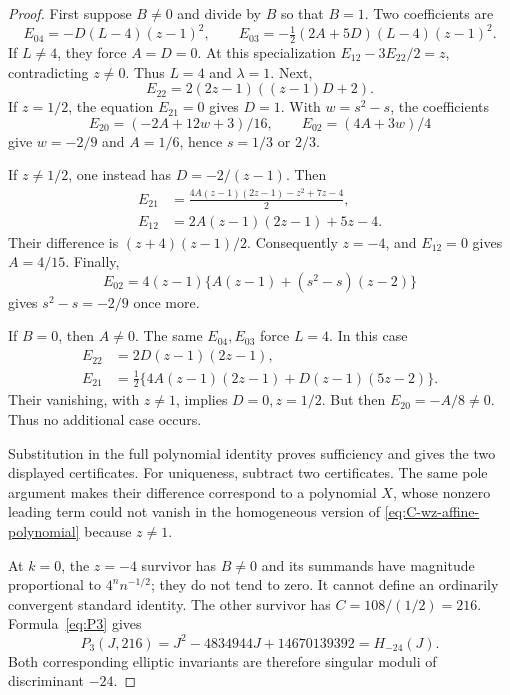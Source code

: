 \begin{proof}
First suppose $B\ne0$ and divide by $B$ so that $B=1$.  Two
coefficients are
\[
 E_{04}=-D(L-4)(z-1)^2,\qquad
 E_{03}=-\tfrac12(2A+5D)(L-4)(z-1)^2.
\]
If $L\ne4$, they force $A=D=0$.  At this specialization
$E_{12}-3E_{22}/2=z$, contradicting $z\ne0$.  Thus $L=4$ and
$\lambda=1$.  Next,
\[
 E_{22}=2(2z-1)((z-1)D+2).
\]
If $z=1/2$, the equation $E_{21}=0$ gives $D=1$.  With
$w=s^2-s$, the coefficients
\[
 E_{20}=(-2A+12w+3)/16,\qquad E_{02}=(4A+3w)/4
\]
give $w=-2/9$ and $A=1/6$, hence $s=1/3$ or $2/3$.

If $z\ne1/2$, one instead has $D=-2/(z-1)$.  Then
\begin{align*}
 E_{21}&=\frac{4A(z-1)(2z-1)-z^2+7z-4}{2},\\
 E_{12}&=2A(z-1)(2z-1)+5z-4.
\end{align*}
Their difference is $(z+4)(z-1)/2$.  Consequently $z=-4$, and
$E_{12}=0$ gives $A=4/15$.  Finally,
\[
 E_{02}=4(z-1)\{A(z-1)+(s^2-s)(z-2)\}
\]
gives $s^2-s=-2/9$ once more.

If $B=0$, then $A\ne0$.  The same $E_{04},E_{03}$ force $L=4$.
In this case
\begin{align*}
 E_{22}&=2D(z-1)(2z-1),\\
 E_{21}&=\tfrac12\{4A(z-1)(2z-1)+D(z-1)(5z-2)\}.
\end{align*}
Their vanishing, with $z\ne1$, implies $D=0,z=1/2$.  But then
$E_{20}=-A/8\ne0$.  Thus no additional case occurs.

Substitution in the full polynomial identity proves sufficiency and
gives the two displayed certificates.  For uniqueness, subtract two
certificates.  The same pole argument makes their difference
correspond to a polynomial $X$, whose nonzero leading term could not
vanish in the homogeneous version of
\eqref{eq:C-wz-affine-polynomial} because $z\ne1$.

At $k=0$, the $z=-4$ survivor has $B\ne0$ and its summands have
magnitude proportional to $4^n n^{-1/2}$; they do not tend to zero.
It cannot define an ordinarily convergent standard identity.  The
other survivor has $C=108/(1/2)=216$.  Formula~\eqref{eq:P3} gives
\[
 P_3(J,216)=J^2-4834944J+14670139392=H_{-24}(J).
\]
Both corresponding elliptic invariants are therefore singular moduli
of discriminant $-24$.
\end{proof}

